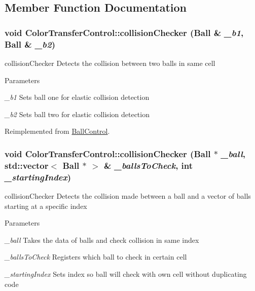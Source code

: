 \subsection{Member Function Documentation}
\hypertarget{classColorTransferControl_a9567be01e35663e82691d1756028899a}{
\subsubsection[{collisionChecker}]{\setlength{\rightskip}{0pt plus 5cm}void ColorTransferControl::collisionChecker ({\bf Ball} \& {\em \_\-b1}, \/  {\bf Ball} \& {\em \_\-b2})}}
\label{classColorTransferControl_a9567be01e35663e82691d1756028899a}


collisionChecker Detects the collision between two balls in same cell 
\begin{DoxyParams}{Parameters}
\item[{\em \_\-b1}]Sets ball one for elastic collision detection \item[{\em \_\-b2}]Sets ball two for elastic collision detection \end{DoxyParams}


Reimplemented from \hyperlink{classBallControl_a062a70454845cbf25fe7f15554676ab9}{BallControl}.\hypertarget{classColorTransferControl_a082bba0dbe1e10809d9fb8dc2386a1da}{
\subsubsection[{collisionChecker}]{\setlength{\rightskip}{0pt plus 5cm}void ColorTransferControl::collisionChecker ({\bf Ball} $\ast$ {\em \_\-ball}, \/  std::vector$<$ {\bf Ball} $\ast$ $>$ \& {\em \_\-ballsToCheck}, \/  int {\em \_\-startingIndex})}}
\label{classColorTransferControl_a082bba0dbe1e10809d9fb8dc2386a1da}


collisionChecker Detects the collision made between a ball and a vector of balls starting at a specific index 
\begin{DoxyParams}{Parameters}
\item[{\em \_\-ball}]Takes the data of balls and check collision in same index \item[{\em \_\-ballsToCheck}]Registers which ball to check in certain cell \item[{\em \_\-startingIndex}]Sets index so ball will check with own cell without duplicating code \end{DoxyParams}


